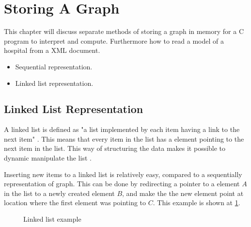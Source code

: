 \section{Storing A Graph}

This chapter will discuss separate methods of storing a graph in memory for a C program to interpret and compute. Furthermore how to read a model of a hospital from a XML document.

\begin{itemize}
	\item Sequential representation.
	\item Linked list representation.
\end{itemize} 


\subsection{Linked List Representation}
\label{sub:list}
A linked list is defined as "a list implemented by each item having a link to the next item" \cite{linked_list_def}.
This means that every item in the list has a element pointing to the next item in the list. This way of structuring the data makes it possible to dynamic manipulate the list \cite{Linked_List}.

Inserting new items to a linked list is relatively easy, compared to a sequentially representation of graph. 
This can be done by redirecting a pointer to a element $A$ in the list to a newly created element $B$, and make the the new element point at location where the first element was pointing to $C$. This example is shown at \cref{fig:link}.

\begin{figure}[h]
 \centering
{}
\caption{Linked list example} \label{fig:link}
\end{figure}

